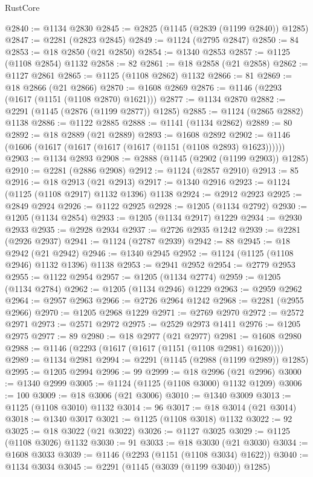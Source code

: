\begin{lexlean}{RustCore}
\begin{coremodule}
@2840 := @1134 @2830
@2845 := @2825 (@1145 (@2839 (@1199 @2840)) @1285)
@2847 := @2281 (@2823 @2845)
@2849 := @1124 (@2795 @2847)
@2850 := 84
@2853 := @18 @2850 (@21 @2850)
@2854 := @1340 @2853
@2857 := @1125 (@1108 @2854) @1132
@2858 := 82
@2861 := @18 @2858 (@21 @2858)
@2862 := @1127 @2861
@2865 := @1125 (@1108 @2862) @1132
@2866 := 81
@2869 := @18 @2866 (@21 @2866)
@2870 := @1608 @2869
@2876 := @1146 (@2293 (@1617 (@1151 (@1108 @2870) @1621)))
@2877 := @1134 @2870
@2882 := @2291 (@1145 (@2876 (@1199 @2877)) @1285)
@2885 := @1124 (@2865 @2882) @1138
@2886 := @1122 @2885
@2888 := @1141 (@1134 @2862)
@2889 := 80
@2892 := @18 @2889 (@21 @2889)
@2893 := @1608 @2892
@2902 := @1146 (@1606 (@1617 (@1617 (@1617 (@1617 (@1151 (@1108 @2893) @1623))))))
@2903 := @1134 @2893
@2908 := @2888 (@1145 (@2902 (@1199 @2903)) @1285)
@2910 := @2281 (@2886 @2908)
@2912 := @1124 (@2857 @2910)
@2913 := 85
@2916 := @18 @2913 (@21 @2913)
@2917 := @1340 @2916
@2923 := @1124 (@1125 (@1108 @2917) @1132 @1396) @1138
@2924 := @2912 @2923
@2925 := @2849 @2924
@2926 := @1122 @2925
@2928 := @1205 (@1134 @2792)
@2930 := @1205 (@1134 @2854)
@2933 := @1205 (@1134 @2917) @1229
@2934 := @2930 @2933
@2935 := @2928 @2934
@2937 := @2726 @2935 @1242
@2939 := @2281 (@2926 @2937)
@2941 := @1124 (@2787 @2939)
@2942 := 88
@2945 := @18 @2942 (@21 @2942)
@2946 := @1340 @2945
@2952 := @1124 (@1125 (@1108 @2946) @1132 @1396) @1138
@2953 := @2941 @2952
@2954 := @2779 @2953
@2955 := @1122 @2954
@2957 := @1205 (@1134 @2774)
@2959 := @1205 (@1134 @2784)
@2962 := @1205 (@1134 @2946) @1229
@2963 := @2959 @2962
@2964 := @2957 @2963
@2966 := @2726 @2964 @1242
@2968 := @2281 (@2955 @2966)
@2970 := @1205 @2968 @1229
@2971 := @2769 @2970
@2972 := @2572 @2971
@2973 := @2571 @2972
@2975 := @2529 @2973 @1411
@2976 := @1205 @2975
@2977 := 89
@2980 := @18 @2977 (@21 @2977)
@2981 := @1608 @2980
@2988 := @1146 (@2293 (@1617 (@1617 (@1151 (@1108 @2981) @1620))))
@2989 := @1134 @2981
@2994 := @2291 (@1145 (@2988 (@1199 @2989)) @1285)
@2995 := @1205 @2994
@2996 := 99
@2999 := @18 @2996 (@21 @2996)
@3000 := @1340 @2999
@3005 := @1124 (@1125 (@1108 @3000) @1132 @1209)
@3006 := 100
@3009 := @18 @3006 (@21 @3006)
@3010 := @1340 @3009
@3013 := @1125 (@1108 @3010) @1132
@3014 := 96
@3017 := @18 @3014 (@21 @3014)
@3018 := @1340 @3017
@3021 := @1125 (@1108 @3018) @1132
@3022 := 92
@3025 := @18 @3022 (@21 @3022)
@3026 := @1127 @3025
@3029 := @1125 (@1108 @3026) @1132
@3030 := 91
@3033 := @18 @3030 (@21 @3030)
@3034 := @1608 @3033
@3039 := @1146 (@2293 (@1151 (@1108 @3034) @1622))
@3040 := @1134 @3034
@3045 := @2291 (@1145 (@3039 (@1199 @3040)) @1285)

\end{coremodule}
\end{lexlean}
